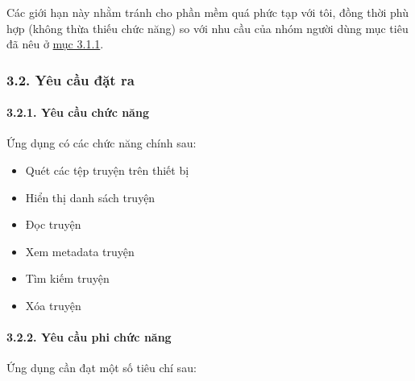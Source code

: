 \documentclass[
]{article}
\providecommand{\tightlist}{%
  \setlength{\itemsep}{0pt}\setlength{\parskip}{0pt}}
\begin{document}
Các giới hạn này nhằm tránh cho phần mềm quá phức tạp với tôi, đồng thời
phù hợp (không thừa thiếu chức năng) so với nhu cầu của nhóm người dùng
mục tiêu đã nêu ở \protect\hyperlink{P3.1.1-users}{mục 3.1.1}.

\hypertarget{yuxeau-cux1ea7u-ux111ux1eb7t-ra}{%
\subsubsection{\texorpdfstring{3.2. Yêu cầu đặt ra
}{3.2. Yêu cầu đặt ra }}\label{yuxeau-cux1ea7u-ux111ux1eb7t-ra}}

\hypertarget{yuxeau-cux1ea7u-chux1ee9c-nux103ng}{%
\paragraph{\texorpdfstring{3.2.1. Yêu cầu chức năng
}{3.2.1. Yêu cầu chức năng }}\label{yuxeau-cux1ea7u-chux1ee9c-nux103ng}}

Ứng dụng có các chức năng chính sau:

\begin{itemize}
\tightlist
\item
  Quét các tệp truyện trên thiết bị
\item
  Hiển thị danh sách truyện
\item
  Đọc truyện
\item
  Xem metadata truyện
\item
  Tìm kiếm truyện
\item
  Xóa truyện
\end{itemize}

\hypertarget{yuxeau-cux1ea7u-phi-chux1ee9c-nux103ng}{%
\paragraph{\texorpdfstring{3.2.2. Yêu cầu phi chức năng
}{3.2.2. Yêu cầu phi chức năng }}\label{yuxeau-cux1ea7u-phi-chux1ee9c-nux103ng}}

Ứng dụng cần đạt một số tiêu chí sau:
\end{document}
